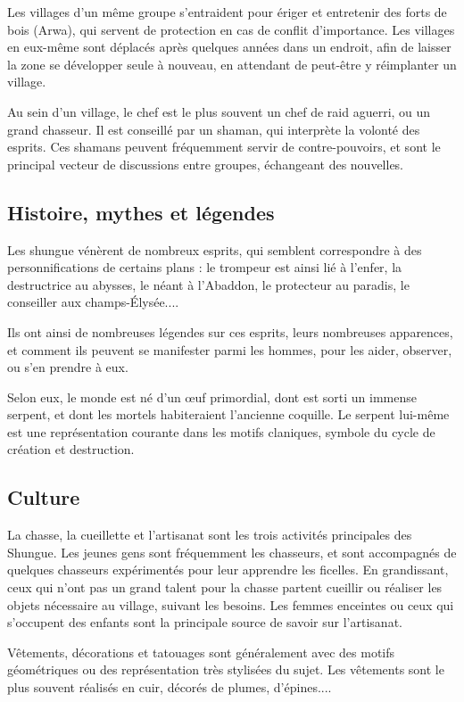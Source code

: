 \documentclass[10pt,a4paper]{book}
\begin{document}
Les villages d'un même groupe s'entraident pour ériger et entretenir des forts de bois (Arwa), qui servent de protection en cas de conflit d'importance. Les villages en eux-même sont déplacés après quelques années dans un endroit, afin de laisser la zone se développer seule à nouveau, en attendant de peut-être y réimplanter un village.

Au sein d'un village, le chef est le plus souvent un chef de raid aguerri, ou un grand chasseur. Il est conseillé par un shaman, qui interprète la volonté des esprits. Ces shamans peuvent fréquemment servir de contre-pouvoirs, et sont le principal vecteur de discussions entre groupes, échangeant des nouvelles.

\subsection{Histoire, mythes et légendes}
Les shungue vénèrent de nombreux esprits, qui semblent correspondre  à des personnifications de certains plans : le trompeur est ainsi lié à l'enfer, la destructrice au abysses, le néant à l'Abaddon, le protecteur au paradis, le conseiller aux champs-Élysée....

Ils ont ainsi de nombreuses légendes sur ces esprits, leurs nombreuses apparences, et comment ils peuvent se manifester parmi les hommes, pour les aider, observer, ou s'en prendre à eux.

Selon eux, le monde est né d'un œuf primordial, dont est sorti un immense serpent, et dont les mortels habiteraient l'ancienne coquille. Le serpent lui-même est une représentation courante dans les motifs claniques, symbole du cycle de création et destruction.

\subsection{Culture}
La chasse, la cueillette et l'artisanat sont les trois activités principales des Shungue. Les jeunes gens sont fréquemment les chasseurs, et sont accompagnés de quelques chasseurs expérimentés pour leur apprendre les ficelles. En grandissant, ceux qui n'ont pas un grand talent pour la chasse partent cueillir ou réaliser les objets nécessaire au village, suivant les besoins. Les femmes enceintes ou ceux qui s'occupent des enfants sont la principale source de savoir sur l'artisanat.

Vêtements, décorations et tatouages sont généralement avec des motifs géométriques ou des représentation très stylisées du sujet. Les vêtements sont le plus souvent réalisés en cuir, décorés de plumes, d'épines.... 
\end{document}
